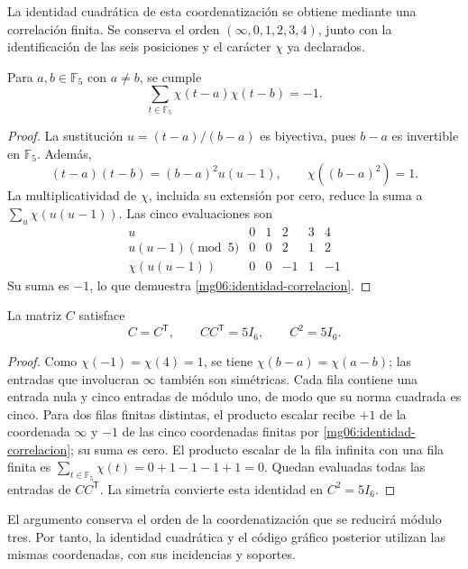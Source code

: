 La identidad cuadrática de esta coordenatización se obtiene mediante una
correlación finita. Se conserva el orden
\((\infty,0,1,2,3,4)\), junto con la identificación de las seis
posiciones y el carácter \(\chi\) ya declarados.

\begin{lemma}
\label{mg06:correlacion}
Para \(a,b\in\mathbb F_5\) con \(a\ne b\), se cumple
\begin{equation}
 \sum_{t\in\mathbb F_5}\chi(t-a)\chi(t-b)=-1.
 \label{mg06:identidad-correlacion}
\end{equation}
\end{lemma}
\begin{proof}
La sustitución \(u=(t-a)/(b-a)\) es biyectiva, pues \(b-a\) es
invertible en \(\mathbb F_5\). Además,
\[
 (t-a)(t-b)=(b-a)^2u(u-1),\qquad
 \chi((b-a)^2)=1.
\]
La multiplicatividad de \(\chi\), incluida su extensión por cero,
reduce la suma a \(\sum_u\chi(u(u-1))\). Las cinco evaluaciones son
\begin{equation}
\begin{array}{c|rrrrr}
 u&0&1&2&3&4\\\hline
 u(u-1)\pmod5&0&0&2&1&2\\
 \chi(u(u-1))&0&0&-1&1&-1
\end{array}
\label{mg06:cinco-evaluaciones}
\end{equation}
Su suma es \(-1\), lo que demuestra
\eqref{mg06:identidad-correlacion}.
\end{proof}

\begin{proposition}
\label{mg06:conferencia}
La matriz \(C\) satisface
\begin{equation}
 C=C^{\mathsf T},\qquad CC^{\mathsf T}=5I_6,
 \qquad C^2=5I_6.
 \label{mg06:identidad-conferencia}
\end{equation}
\end{proposition}
\begin{proof}
Como \(\chi(-1)=\chi(4)=1\), se tiene
\(\chi(b-a)=\chi(a-b)\); las entradas que involucran
\(\infty\) también son simétricas. Cada fila contiene una entrada
nula y cinco entradas de módulo uno, de modo que su norma cuadrada
es cinco. Para dos filas finitas distintas, el producto escalar
recibe \(+1\) de la coordenada \(\infty\) y \(-1\) de las cinco
coordenadas finitas por \eqref{mg06:identidad-correlacion}; su suma
es cero. El producto escalar de la fila infinita con una fila finita
es \(\sum_{t\in\mathbb F_5}\chi(t)=0+1-1-1+1=0\).
Quedan evaluadas todas las entradas de \(CC^{\mathsf T}\).
La simetría convierte esta identidad en \(C^2=5I_6\).
\end{proof}

El argumento conserva el orden de la coordenatización que se reducirá módulo
tres. Por tanto, la identidad cuadrática y el código gráfico posterior
utilizan las mismas coordenadas, con sus incidencias y soportes.
